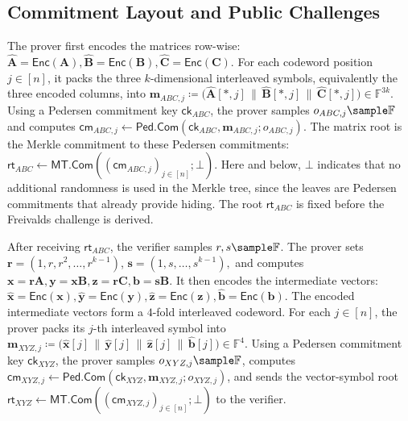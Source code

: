 \documentclass[conference,compsoc]{IEEEtran}
\newcommand{\cm}{\textsf{cm}}
\newcommand{\rt}{\textsf{rt}}
\newcommand{\merkleC}{\textsf{MT.Com}}
\newcommand{\ck}{\textsf{ck}}
\newcommand{\pedC}{\textsf{Ped.Com}}
\newcommand{\mat}{\mathbf}          %
\newcommand{\vect}{\mathbf}         %
\renewcommand{\enc}{\mathsf{Enc}}   %
\renewcommand{\ck}{{\textsf{ck}}}
\theoremstyle{plain}
\theoremstyle{definition}
\theoremstyle{remark}
\begin{document}
\subsection{Commitment Layout and Public Challenges}
\label{sec:commitment-challenge}

The prover first encodes the matrices row-wise:
{\footnotesize
\(\widehat{\mat{A}}=\enc(\mat{A}),
  \widehat{\mat{B}}=\enc(\mat{B}),
  \widehat{\mat{C}}=\enc(\mat{C})\).
}
For each codeword position \(j\in[n]\), it packs the three \(k\)-dimensional
interleaved symbols, equivalently the three encoded columns, into
{\footnotesize
\(\vect{m}_{ABC,j}
  \coloneqq
  \big(
    \widehat{\mat{A}}[*,j]\,
    \|\,\widehat{\mat{B}}[*,j]\,
    \|\,\widehat{\mat{C}}[*,j]
  \big)
  \in\mathbb{F}^{3k}\).
}
Using a Pedersen commitment key \(\ck_{ABC}\), the prover samples
\(o_{ABC,j}\sample\mathbb{F}\) and computes
{\footnotesize
\(\cm_{ABC,j}
  \gets
  \pedC(\ck_{ABC},\vect{m}_{ABC,j};o_{ABC,j})\).
}
The matrix root is the Merkle commitment to these Pedersen commitments:
{\footnotesize
\(\rt_{ABC}
  \gets
  \merkleC((\cm_{ABC,j})_{j\in[n]};\bot)\).
}
Here and below, \(\bot\) indicates that no additional randomness is used in the
Merkle tree, since the leaves are Pedersen commitments that already provide
hiding. The root \(\rt_{ABC}\) is fixed before the Freivalds challenge is
derived.

After receiving \(\rt_{ABC}\), the verifier samples \(r, \ensuremath{s}\sample\mathbb{F}\). 
The prover sets {\footnotesize \(\vect{r}=(1,r,r^2,\ldots,r^{k-1})\), \ensuremath{\vect{s}=(1,s,\ldots,s^{k-1}),
}}
and computes
{\footnotesize
\(\vect{x}=\vect{r}\mat{A},
  \vect{y}=\vect{x}\mat{B},
  \vect{z}=\vect{r}\mat{C},
  \ensuremath{\vect{b}=\vect{s}\mat{B}.}
  \)
}
It then encodes the intermediate vectors:
{\footnotesize
\(\widehat{\vect{x}}=\enc(\vect{x}),
  \widehat{\vect{y}}=\enc(\vect{y}),
  \widehat{\vect{z}}=\enc(\vect{z}),
  \ensuremath{\widehat{\vect{b}}=\enc(\vect{b})}\).
}
The encoded intermediate vectors form a \(\ensuremath{4}\)-fold interleaved codeword.  For
each \(j\in[n]\), the prover packs its \(j\)-th interleaved symbol into
{\footnotesize
\(\vect{m}_{XYZ,j}
  \coloneqq
  \big(
    \widehat{\vect{x}}[j]\,
    \|\,\widehat{\vect{y}}[j]\,
    \|\,\widehat{\vect{z}}[j]\,
    \ensuremath{\|\,\widehat{\vect{b}}[j]}
  \big)
  \in\mathbb{F}^{\ensuremath{4}}\).
}
Using a Pedersen commitment key \(\ck_{XYZ}\), the prover samples
\(o_{XYZ,j}\sample\mathbb{F}\), computes
{\footnotesize
\(\cm_{XYZ,j}
  \gets
  \pedC(\ck_{XYZ},\vect{m}_{XYZ,j};o_{XYZ,j})\),
}
and sends the vector-symbol root
{\footnotesize
\(\rt_{XYZ}
  \gets
  \merkleC((\cm_{XYZ,j})_{j\in[n]};\bot)\)
}
to the verifier.
\end{document}
